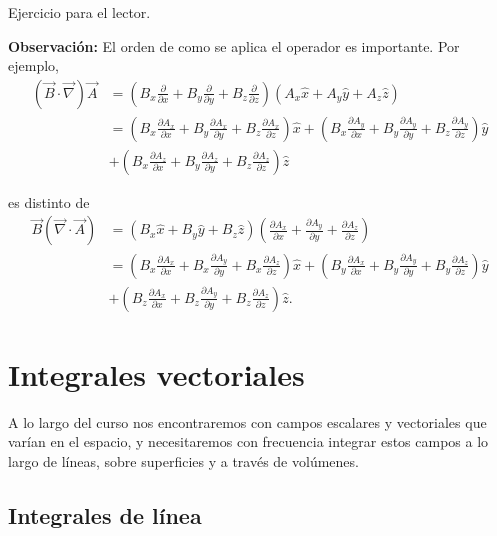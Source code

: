\begin{demo}
Ejercicio para el lector.
\end{demo}

\textbf{Observación:} El orden de como se aplica el operador es importante. Por ejemplo,
\begin{align*}
    (\Vec{B} \cdot \Vec{\nabla}) \Vec{A} &= \left( B_x \frac{\partial}{\partial x} + B_y \frac{\partial}{\partial y} + B_z \frac{\partial}{\partial z}\right) \left( A_x \hat{x} + A_y \hat{y} + A_z \hat{z}\right) \\
    &= \left(B_x \frac{\partial A_x}{\partial x} + B_y \frac{\partial A_x}{\partial y}  + B_z\frac{\partial A_x}{\partial z} \right) \hat{x} + \left(B_x \frac{\partial A_y}{\partial x} + B_y \frac{\partial A_y}{\partial y}  + B_z\frac{\partial A_y}{\partial z} \right) \hat{y} \\
    & + \left(B_x \frac{\partial A_z}{\partial x} + B_y \frac{\partial A_z}{\partial y}  + B_z\frac{\partial A_z}{\partial z} \right) \hat{z}
\end{align*}

es distinto de
\begin{align*}
    \Vec{B} ( \Vec{\nabla} \cdot \Vec{A}) &= \left( B_x \hat{x} + B_y \hat{y} + B_z \hat{z}\right) \left( \frac{\partial A_x}{\partial x} + \frac{\partial A_y}{\partial y} + \frac{\partial A_z}{\partial z}\right)  \\
    &= \left(B_x \frac{\partial A_x}{\partial x} + B_x \frac{\partial A_y}{\partial y}  + B_x\frac{\partial A_z}{\partial z} \right) \hat{x} + \left(B_y \frac{\partial A_x}{\partial x} + B_y \frac{\partial A_y}{\partial y}  + B_y \frac{\partial A_z}{\partial z} \right) \hat{y} \\
    & + \left(B_z \frac{\partial A_x}{\partial x} + B_z \frac{\partial A_y}{\partial y}  + B_z\frac{\partial A_z}{\partial z} \right) \hat{z}.
\end{align*}

\section{Integrales vectoriales}

A lo largo del curso nos encontraremos con campos escalares y vectoriales que varían en el espacio, y necesitaremos con frecuencia integrar estos campos a lo largo de líneas, sobre superficies y a través de volúmenes.

\subsection{Integrales de línea}

